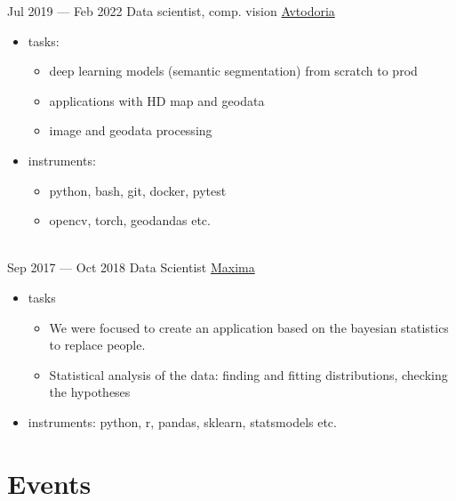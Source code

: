 \documentclass[letterpaper]{twentysecondcv} %
\begin{document}
\begin{twenty}
        \twentyitem
        {Jul 2019 —}
        {Feb 2022}
        {Data scientist, comp. vision}
        {  \href{https://avtodoria.ru/}{Avtodoria}}
        {}
        {
        {\begin{itemize}
            \item tasks:
            {\begin{itemize}
                \item deep learning models (semantic segmentation) from scratch to prod
                \item applications with HD map and geodata
                \item image and geodata processing
            \end{itemize}}
            \item instruments:
            {\begin{itemize}
                \item python, bash, git, docker, pytest
                \item opencv, torch, geodandas etc.
            \end{itemize}
            }
        \end{itemize}}
        }
        \\
        \twentyitem
        {Sep 2017 —}
        {Oct 2018}
        {Data Scientist}
        {\href{http://maxima.life/}{Maxima}}
        {}
        {
        {\begin{itemize}
            \item tasks
                {\begin{itemize}
                    \item We were focused to create an application based on the bayesian statistics to replace people.
                    \item Statistical analysis of the data: finding and fitting distributions, checking the hypotheses
                \end{itemize}
                }
            \item instruments: python, r, pandas, sklearn, statsmodels etc.
        \end{itemize}}
        }
\end{twenty}


\section{Events}
\end{document}
